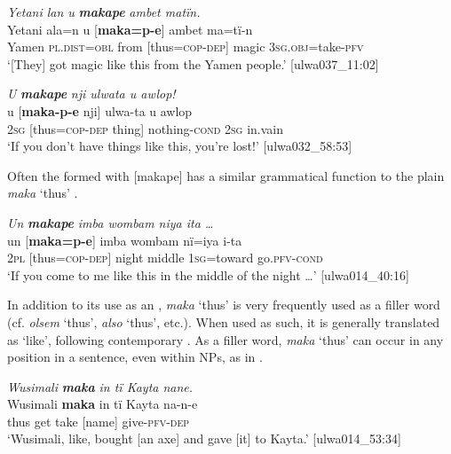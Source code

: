 \ea%
    \label{ex:otherwc:120}
          \textit{Yetani lan u} \textbf{\textit{makape}} \textit{ambet matïn.}\\
\gll    Yetani  ala=n      u    [\textbf{maka=p-e}]    ambet ma=tï-n\\
    Yamen  \textsc{pl.dist=obl}  from  [thus=\textsc{cop-dep]}  magic    \textsc{3sg.obj}=take-\textsc{pfv}\\
\glt `[They] got magic like this from the Yamen people.’ [ulwa037\_11:02]
\z

\ea%
    \label{ex:otherwc:121}
          \textit{U} \textbf{\textit{makape}} \textit{nji ulwata u awlop!}\\
\gll    u    [\textbf{maka-p-e}      nji]    ulwa-ta    u    awlop\\
    2\textsc{sg}  [thus=\textsc{cop-dep}  thing]  nothing-\textsc{cond}  2\textsc{sg}  in.vain\\
\glt `If you don’t have things like this, you’re lost!’ [ulwa032\_58:53]
\z

Often the  formed with [makape] has a similar grammatical function to the plain  \textit{maka} ‘thus’ .

\ea%
    \label{ex:otherwc:122}
          \textit{Un} \textbf{\textit{makape}} \textit{imba wombam niya ita …}\\
\gll    un  [\textbf{maka=p-e}]    imba  wombam  nï=iya      i-ta\\
    2\textsc{pl}  [thus=\textsc{cop-dep]}  night  middle    1\textsc{sg=}toward  go\textsc{.pfv-cond}\\
\glt `If you come to me like this in the middle of the night …’ [ulwa014\_40:16]
\z

In addition to its use as an , \textit{maka} ‘thus’ is very frequently used as a filler word (cf.  \textit{olsem} ‘thus’,  \textit{also} ‘thus’, etc.). When used as such, it is generally translated as ‘like’, following contemporary   . As a filler word, \textit{maka} ‘thus’ can occur in any position in a sentence, even within NPs, as in .


\ea%
    \label{ex:otherwc:123}
          \textit{Wusimali} \textbf{\textit{maka}} \textit{in tï Kayta nane.}\\
\gll    Wusimali  \textbf{maka}  in  tï    Kayta  na-n-e\\
    [name]    thus  get  take  [name]  give-\textsc{pfv-dep}\\
\glt `Wusimali, like, bought [an axe] and gave [it] to Kayta.’ [ulwa014\_53:34]
\z

